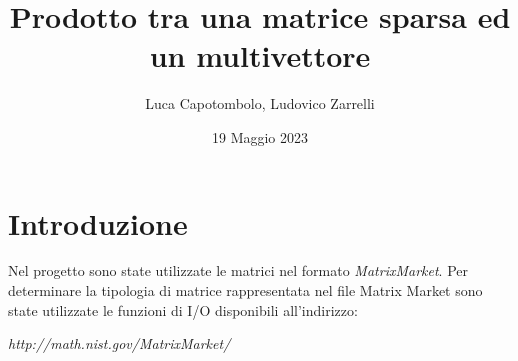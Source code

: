 \documentclass{article}
\title{Prodotto tra una matrice sparsa ed un multivettore}
\author{Luca Capotombolo, Ludovico Zarrelli}
\date{19 Maggio 2023}
\begin{document}
\maketitle

\tableofcontents

\section{Introduzione}
Nel progetto sono state utilizzate le matrici nel formato \textit{MatrixMarket}. Per determinare la tipologia di matrice rappresentata nel file Matrix Market sono state utilizzate le funzioni di I/O disponibili all'indirizzo:\\

\begin{center}
\textit{http://math.nist.gov/MatrixMarket/}
\end{center}
\end{document}

